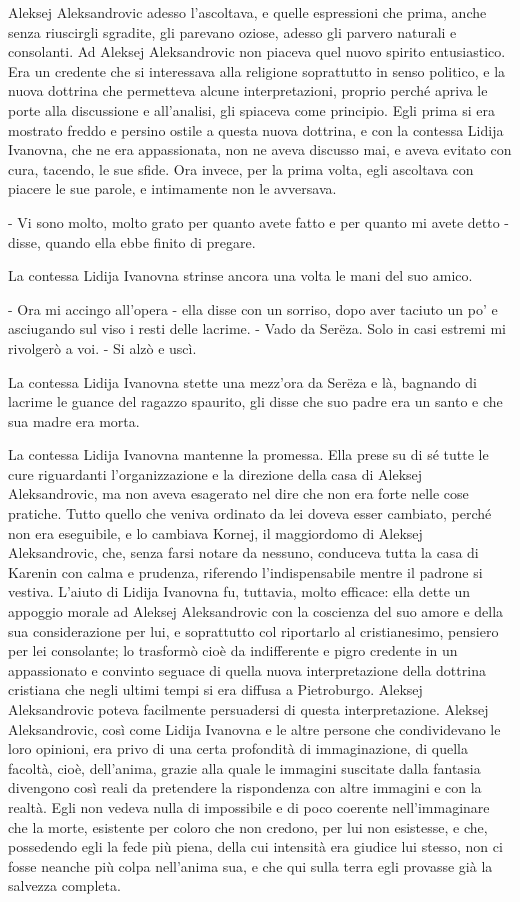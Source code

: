 Aleksej Aleksandrovic adesso l'ascoltava, e quelle espressioni che prima, anche senza riuscirgli sgradite, gli parevano oziose, adesso gli parvero naturali e consolanti. Ad Aleksej Aleksandrovic non piaceva quel nuovo spirito entusiastico. Era un credente che si interessava alla religione soprattutto in senso politico, e la nuova dottrina che permetteva alcune interpretazioni, proprio perché apriva le porte alla discussione e all'analisi, gli spiaceva come principio. Egli prima si era mostrato freddo e persino ostile a questa nuova dottrina, e con la contessa Lidija Ivanovna, che ne era appassionata, non ne aveva discusso mai, e aveva evitato con cura, tacendo, le sue sfide. Ora invece, per la prima volta, egli ascoltava con piacere le sue parole, e intimamente non le avversava. 

- Vi sono molto, molto grato per quanto avete fatto e per quanto mi avete detto - disse, quando ella ebbe finito di pregare. 

La contessa Lidija Ivanovna strinse ancora una volta le mani del suo amico. 

- Ora mi accingo all'opera - ella disse con un sorriso, dopo aver taciuto un po' e asciugando sul viso i resti delle lacrime. - Vado da Serëza. Solo in casi estremi mi rivolgerò a voi. - Si alzò e uscì. 

La contessa Lidija Ivanovna stette una mezz'ora da Serëza e là, bagnando di lacrime le guance del ragazzo spaurito, gli disse che suo padre era un santo e che sua madre era morta. 

La contessa Lidija Ivanovna mantenne la promessa. Ella prese su di sé tutte le cure riguardanti l'organizzazione e la direzione della casa di Aleksej Aleksandrovic, ma non aveva esagerato nel dire che non era forte nelle cose pratiche. Tutto quello che veniva ordinato da lei doveva esser cambiato, perché non era eseguibile, e lo cambiava Kornej, il maggiordomo di Aleksej Aleksandrovic, che, senza farsi notare da nessuno, conduceva tutta la casa di Karenin con calma e prudenza, riferendo l'indispensabile mentre il padrone si vestiva. L'aiuto di Lidija Ivanovna fu, tuttavia, molto efficace: ella dette un appoggio morale ad Aleksej Aleksandrovic con la coscienza del suo amore e della sua considerazione per lui, e soprattutto col riportarlo al cristianesimo, pensiero per lei consolante; lo trasformò cioè da indifferente e pigro credente in un appassionato e convinto seguace di quella nuova interpretazione della dottrina cristiana che negli ultimi tempi si era diffusa a Pietroburgo. Aleksej Aleksandrovic poteva facilmente persuadersi di questa interpretazione. Aleksej Aleksandrovic, così come Lidija Ivanovna e le altre persone che condividevano le loro opinioni, era privo di una certa profondità di immaginazione, di quella facoltà, cioè, dell'anima, grazie alla quale le immagini suscitate dalla fantasia divengono così reali da pretendere la rispondenza con altre immagini e con la realtà. Egli non vedeva nulla di impossibile e di poco coerente nell'immaginare che la morte, esistente per coloro che non credono, per lui non esistesse, e che, possedendo egli la fede più piena, della cui intensità era giudice lui stesso, non ci fosse neanche più colpa nell'anima sua, e che qui sulla terra egli provasse già la salvezza completa. 

